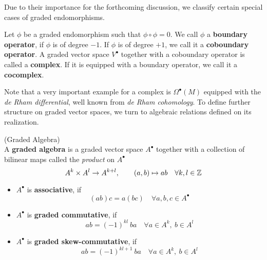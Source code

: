 Due to their importance for the forthcoming discussion, we classify certain special cases of graded endomorphisms.

\begin{definition}
  Let $\phi$ be a graded endomorphism such that $\phi \circ \phi = 0$. We call $\phi$ a \textbf{boundary operator}, if $\phi$ is of degree $-1$. If $\phi$ is of degree $+1$, we call it a \textbf{coboundary operator}. A graded vector space $V^\bullet$ together with a coboundary operator is called a \textbf{complex}. If it is equipped with a boundary operator, we call it a \textbf{cocomplex}.
\end{definition}

Note that a very important example for a complex is $\Omega^\bullet(M)$ equipped with the \emph{de Rham differential}, well known from \emph{de Rham cohomology}. To define further structure on graded vector spaces, we turn to algebraic relations defined on its realization.

\begin{definition} (Graded Algebra)\\
  A \textbf{graded algebra} is a graded vector space $A^\bullet$ together with a collection of bilinear maps called the \emph{product} on $A^\bullet$
  $$ A^k \times A^l \rightarrow A^{k+l}, \quad \quad (a,b) \mapsto ab \quad  \forall k,l \in \mathbb{Z}$$
  \begin{itemize}
    \item $A^\bullet$ is \textbf{associative}, if
    $$ (ab)c = a(bc) \quad \forall a,b,c \in A^\bullet $$

    \item $A^\bullet$ is \textbf{graded commutative}, if
    $$ ab = (-1)^{kl}\ ba \quad \forall a \in A^k, \ b\in A^l $$

    \item $A^\bullet$ is \textbf{graded skew-commutative}, if
    $$ ab = (-1)^{kl+1}\ ba \quad \forall a \in A^k, \ b\in A^l $$
  \end{itemize}
\end{definition}

